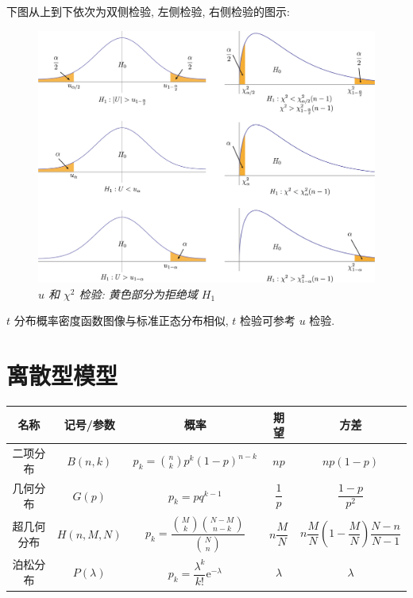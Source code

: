 \documentclass[UTF8]{ctexart}
\newcommand{\E}{\mathrm e}
\begin{document}
下图从上到下依次为双侧检验, 左侧检验, 右侧检验的图示:
\begin{figure}[H]
    \centering
    \includegraphics[width = 0.85\linewidth]{confidence_interval}
    \caption*{\textit{$ u $ 和 $ \chi^2 $ 检验: 黄色部分为拒绝域 $ H_1 $}}
\end{figure}

$ t $ 分布概率密度函数图像与标准正态分布相似, $ t $ 检验可参考 $ u $ 检验.




\newpage
\section{离散型模型}
\renewcommand{\arraystretch}{2.5}
\begin{table}[H]
\centering
\makegapedcells
\begin{tabular}{c|c|c|c|c}
    \hline
    名称 & 记号/参数 & 概率 & 期望 & 方差 \\

    \hline
    二项分布 & $ B(n, k) $ & $ p_k = \binom n k p^k (1 - p)^{n - k} $ & $ n p $ & $ n p (1 - p) $ \\

    \hline
    几何分布 & $ G(p) $ & $ p_k = p q^{k - 1} $ & $ \dfrac{1}{p} $ & $ \dfrac{1 - p}{p^2} $ \\
    
    \hline
    超几何分布 & $ H(n, M, N) $ & $ p_k = \dfrac{\binom{M}{k} \binom{N - M}{n - k}}{\binom{N}{n}} $ & $ n \dfrac{M}{N} $ & $ n \dfrac{M}{N} \left( 1 - \dfrac{M}{N} \right) \dfrac{N - n}{N - 1} $ \\

    \hline
    泊松分布 & $ P(\lambda) $ & $ p_k = \dfrac{\lambda^k}{k!} \E^{-\lambda} $ & $ \lambda $ & $ \lambda $ \\

    \hline
\end{tabular}
\end{table}
\end{document}
